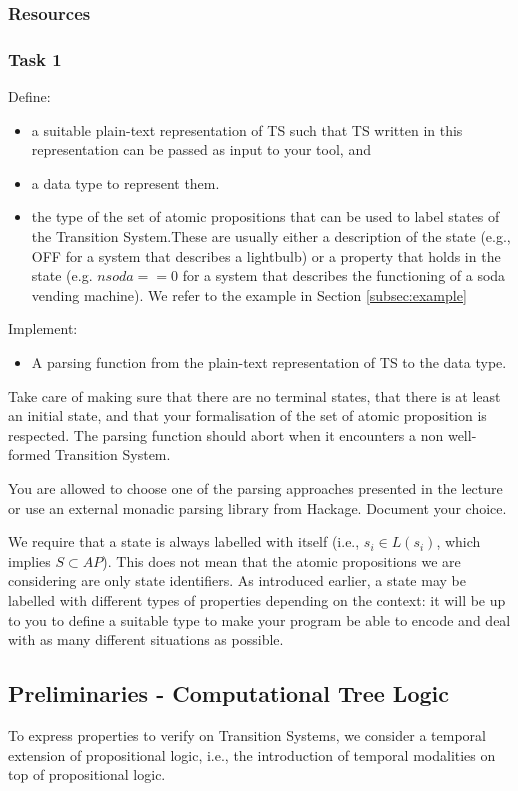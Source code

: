 \documentclass{article}
\begin{document}
\subsubsection*{Resources}
\cite[Paragraph 2.1]{BaKa}

\subsubsection*{Task 1}
Define:
\begin{itemize}
    \item a suitable plain-text representation of TS such that TS written in this representation
          can be passed as input to your tool, and
    \item a data type to represent them. 
    \item the type of the set of atomic propositions that can be used to label states of the           Transition System.These are usually either a description of the state (e.g., OFF for a         system that describes a lightbulb) or a property that holds in the state (e.g. $nsoda == 0$     for a system that describes the functioning of a soda vending machine). We refer to  the       example in Section \ref{subsec:example}
\end{itemize} 
Implement: 
\begin{itemize}
    \item A parsing function from the plain-text representation of TS to the data type.
\end{itemize}
Take care of making sure that there are no terminal states, that there is at least an initial state, and that your formalisation of the set of atomic proposition is respected. The parsing function should abort when it encounters a non well-formed Transition System.

You are allowed to choose one of the parsing approaches presented in the lecture or 
use an external monadic parsing library from Hackage. Document your choice.

We require that a state is always labelled with itself 
(i.e., $s_i \in L(s_i)$, which implies $S \subset AP$). This does not mean that the atomic propositions we are considering are only state identifiers. As introduced earlier, a state may be labelled with different types of properties depending on the context: it will be up to you to define a suitable type to make your program be able to encode and deal with as many different situations as possible.

\subsection{Preliminaries - Computational Tree Logic}
\label{subsec-ctl}
To express properties to verify on Transition Systems, we consider a temporal extension of propositional logic, i.e., the introduction of temporal modalities on top of propositional logic. 
\end{document}
